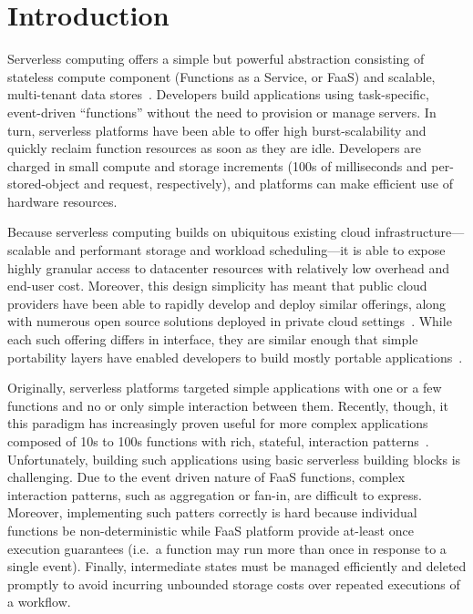 \section{Introduction}

Serverless computing offers a simple but powerful abstraction consisting of
stateless compute component (Functions as a Service, or FaaS) and scalable,
multi-tenant data stores~\cite{berkeley}. Developers build applications using
task-specific, event-driven ``functions'' without the need to provision or
manage servers. In turn, serverless platforms have been able to offer high
burst-scalability and quickly reclaim function resources as soon as they are
idle. Developers are charged in small compute and storage increments (100s of
milliseconds and per-stored-object and request, respectively), and platforms
can make efficient use of hardware resources.

Because serverless computing builds on ubiquitous existing cloud
infrastructure---scalable and performant storage and workload scheduling---it is
able to expose highly granular access to datacenter resources with relatively
low overhead and end-user cost. Moreover, this design simplicity has meant that
public cloud providers have been able to rapidly develop and deploy similar
offerings, along with numerous open source solutions deployed in private cloud
settings~\cite{aws-lambda,gcp-functions,azure-functions,openwhisk,openfaas}.
While each such offering differs in interface, they are similar enough that
simple portability layers have enabled developers to build mostly portable
applications~\cite{boto3,serverless-framework}.

Originally, serverless platforms targeted simple applications with one or a few
functions and no or only simple interaction between them. Recently, though, it
this paradigm has increasingly proven useful for more complex applications
composed of 10s to 100s functions with rich, stateful, interaction
patterns~\cite{excamera, pywren, gg-atc, beldi, boki}. Unfortunately, building
such applications using basic serverless building blocks is challenging.  Due to
the event driven nature of FaaS functions, complex interaction patterns, such as
aggregation or fan-in, are difficult to express. Moreover, implementing such
patters correctly is hard because individual functions be non-deterministic
while FaaS platform provide at-least once execution guarantees (i.e.\ a function
may run more than once in response to a single event). Finally, intermediate
states must be managed efficiently and deleted promptly to avoid incurring
unbounded storage costs over repeated executions of a workflow.

